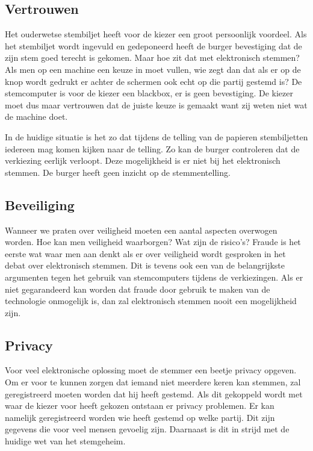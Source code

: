 \documentclass[a4paper]{article}
\begin{document}
\subsection{Vertrouwen}
Het ouderwetse stembiljet heeft voor de kiezer een groot persoonlijk voordeel. 
Als het stembiljet wordt ingevuld en gedeponeerd heeft de burger bevestiging dat de zijn stem goed terecht is gekomen. 
Maar hoe zit dat met elektronisch stemmen?
Als men op een machine een keuze in moet vullen, wie zegt dan dat als er op de knop wordt gedrukt er achter de schermen ook echt op die partij gestemd is?
De stemcomputer is voor de kiezer een blackbox, er is geen bevestiging.
De kiezer moet dus maar vertrouwen dat de juiste keuze is gemaakt want zij weten niet wat de machine doet.

In de huidige situatie is het zo dat tijdens de telling van de papieren stembiljetten iedereen mag komen kijken naar de telling.
Zo kan de burger controleren dat de verkiezing eerlijk verloopt.
Deze mogelijkheid is er niet bij het elektronisch stemmen.
De burger heeft geen inzicht op de stemmentelling. 

\subsection{Beveiliging}
Wanneer we praten over veiligheid moeten een aantal aspecten overwogen worden. 
Hoe kan men veiligheid waarborgen? 
Wat zijn de risico's?
Fraude is het eerste wat waar men aan denkt als er over veiligheid wordt gesproken in het debat over elektronisch stemmen.
Dit is tevens ook een van de belangrijkste argumenten tegen het gebruik van stemcomputers tijdens de verkiezingen.
Als er niet gegarandeerd kan worden dat fraude door gebruik te maken van de technologie onmogelijk is, dan zal elektronisch stemmen nooit een mogelijkheid zijn.

\subsection{Privacy}
Voor veel elektronische oplossing moet de stemmer een beetje privacy opgeven.
Om er voor te kunnen zorgen dat iemand niet meerdere keren kan stemmen, zal geregistreerd moeten worden dat hij heeft gestemd. 
Als dit gekoppeld wordt met waar de kiezer voor heeft gekozen ontstaan er privacy problemen.
Er kan namelijk geregistreerd worden wie heeft gestemd op welke partij. 
Dit zijn gegevens die voor veel mensen gevoelig zijn.
Daarnaast is dit in strijd met de huidige wet van het stemgeheim.
\end{document}
